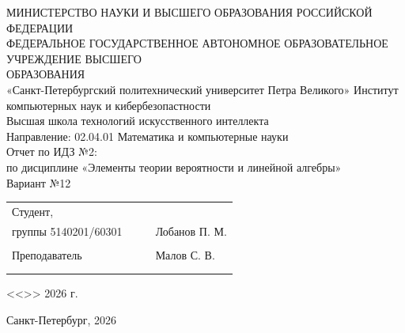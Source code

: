 \documentclass[a4paper, final]{article}
\begin{document}
	
	\thispagestyle{empty}
	\begin{center}
		\normalsize{МИНИСТЕРСТВО НАУКИ И ВЫСШЕГО ОБРАЗОВАНИЯ РОССИЙСКОЙ ФЕДЕРАЦИИ \\ ФЕДЕРАЛЬНОЕ ГОСУДАРСТВЕННОЕ АВТОНОМНОЕ ОБРАЗОВАТЕЛЬНОЕ УЧРЕЖДЕНИЕ ВЫСШЕГО \\ ОБРАЗОВАНИЯ\\ «Санкт-Петербургский политехнический университет Петра Великого»}
		\normalsize{Институт компьютерных наук и кибербезопастности}\\[3pt]
		\normalsize{Высшая школа технологий искусственного интеллекта}\\[10pt]
		\normalsize{Направление: 02.04.01 Математика и компьютерные науки}\\[10pt]
		\hfill \break
		\hfill \break
		\hfill \break
		\hfill \break
		\hfill \break
		\hfill \break
		\normalsize{Отчет по ИДЗ №2:}\\
		\normalsize{по дисциплине «Элементы теории вероятности и линейной алгебры»}\\
		\normalsize{Вариант №12}\\[10pt]
	\end{center}
	\hfill \break
	\hfill \break
	\hfill \break
	\hfill \break
	\begin{tabular}{lcrl}	
		\!\!\!Студент, & \hspace{2cm} & & \\
		\!\!\!группы 5140201/60301 & \hspace{2.13cm} & \underline{\hspace{3cm}} &Лобанов П. М. \\\\
		\!\!\!Преподаватель & \hspace{2cm}  & \underline{\hspace{3cm}} &\hspace{0pt} Малов С. В. \\\\	
		&&\hspace{5cm}
		
	\end{tabular} 	
	\begin{flushright}
		<<\underline{\hspace{1cm}}>>\underline{\hspace{2.5cm}} 2026 г.
	\end{flushright}
	\hfill \break
	\hfill \break
	\hfill \break
	\begin{center} \small{Санкт-Петербург, 2026} \end{center}
	\newpage %
	
\end{document}
